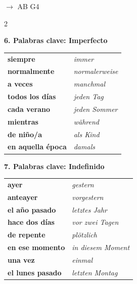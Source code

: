 \documentclass[11pt, a4paper]{article}
\newcommand{\seriftext}[1]{{\fontfamily{ppl}\selectfont #1}}
\newcommand{\es}[1]{\seriftext{\textbf{#1}}}
\newcommand{\de}[1]{\textit{\textcolor{akzent}{#1}}}
\newcommand{\abmark}[1]{{\footnotesize\textcolor{akzent}{$\rightarrow$ AB #1}}}
\newcommand{\abschnitt}[2]{\noindent\textbf{\large #1. #2}}
\begin{document}
\abmark{G4}

\vspace{8pt}

\begin{multicols}{2}

\abschnitt{6}{Palabras clave: Imperfecto}

\vspace{4pt}

\begin{vokabelbox}
{\small
\begin{tabular}{@{}ll@{}}
\es{siempre} & \de{immer} \\[0.3em]
\es{normalmente} & \de{normalerweise} \\[0.3em]
\es{a veces} & \de{manchmal} \\[0.3em]
\es{todos los días} & \de{jeden Tag} \\[0.3em]
\es{cada verano} & \de{jeden Sommer} \\[0.3em]
\es{mientras} & \de{während} \\[0.3em]
\es{de niño/a} & \de{als Kind} \\[0.3em]
\es{en aquella época} & \de{damals} \\
\end{tabular}}
\end{vokabelbox}

\columnbreak

\abschnitt{7}{Palabras clave: Indefinido}

\vspace{4pt}

\begin{vokabelbox}
{\small
\begin{tabular}{@{}ll@{}}
\es{ayer} & \de{gestern} \\[0.3em]
\es{anteayer} & \de{vorgestern} \\[0.3em]
\es{el año pasado} & \de{letztes Jahr} \\[0.3em]
\es{hace dos días} & \de{vor zwei Tagen} \\[0.3em]
\es{de repente} & \de{plötzlich} \\[0.3em]
\es{en ese momento} & \de{in diesem Moment} \\[0.3em]
\es{una vez} & \de{einmal} \\[0.3em]
\es{el lunes pasado} & \de{letzten Montag} \\
\end{tabular}}
\end{vokabelbox}

\end{multicols}
\end{document}
